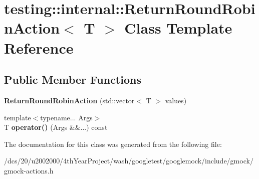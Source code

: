 \hypertarget{classtesting_1_1internal_1_1ReturnRoundRobinAction}{}\section{testing\+:\+:internal\+:\+:Return\+Round\+Robin\+Action$<$ T $>$ Class Template Reference}
\label{classtesting_1_1internal_1_1ReturnRoundRobinAction}
\subsection*{Public Member Functions}
\begin{DoxyCompactItemize}
\item 
\mbox{\label{classtesting_1_1internal_1_1ReturnRoundRobinAction_ad5911c103cb376fe04040a5657022fb4}} 
{\bfseries Return\+Round\+Robin\+Action} (std\+::vector$<$ T $>$ values)
\item 
\mbox{\label{classtesting_1_1internal_1_1ReturnRoundRobinAction_a695bb5e3168bfed7219cb61ad83ddd45}} 
{\footnotesize template$<$typename... Args$>$ }\\T {\bfseries operator()} (Args \&\&...) const
\end{DoxyCompactItemize}


The documentation for this class was generated from the following file\+:\begin{DoxyCompactItemize}
\item 
/dcs/20/u2002000/4th\+Year\+Project/wash/googletest/googlemock/include/gmock/gmock-\/actions.\+h\end{DoxyCompactItemize}
